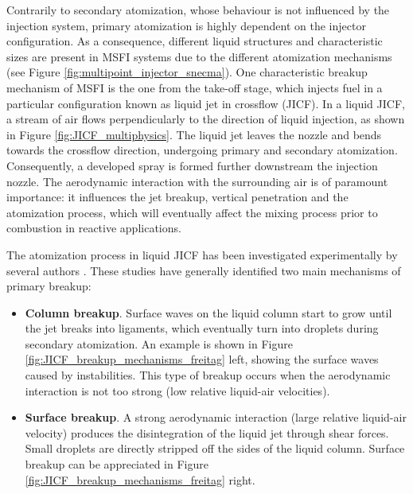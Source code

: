 Contrarily to secondary atomization, whose behaviour is not influenced by the injection system, primary atomization is highly dependent on the injector configuration. As a consequence, different liquid structures and characteristic sizes are present in MSFI systems due to the different atomization mechanisms (see Figure \ref{fig:multipoint_injector_snecma}). One characteristic breakup mechanism of MSFI is the one from the take-off stage, which injects fuel in a particular configuration known as liquid jet in crossflow (JICF). In a liquid JICF, a stream of air flows perpendicularly to the direction of liquid injection, as shown in Figure \ref{fig:JICF_multiphysics}. The liquid jet leaves the nozzle and bends towards the crossflow direction, undergoing primary and secondary atomization. Consequently, a developed spray is formed further downstream the injection nozzle. The aerodynamic interaction with the surrounding air is of paramount importance: it influences the jet breakup, vertical penetration and the atomization process, which will eventually affect the mixing process prior to combustion in reactive applications.

\clearpage


The atomization process in liquid JICF has been investigated experimentally by several authors . These studies have generally identified two main mechanisms of primary breakup:

\begin{itemize}

	\item \textbf{Column breakup}. Surface waves on the liquid column start to grow until the jet breaks into ligaments, which eventually turn into droplets during secondary atomization. An example is shown in Figure \ref{fig:JICF_breakup_mechanisms_freitag} left, showing the surface waves caused by instabilities. This type of breakup occurs when the aerodynamic interaction is not too strong (low relative liquid-air velocities).

\item \textbf{Surface breakup}. A strong aerodynamic interaction (large relative liquid-air velocity) produces the disintegration of the liquid jet through shear forces. Small droplets are directly
stripped off the sides of the liquid column. Surface breakup can be appreciated in Figure \ref{fig:JICF_breakup_mechanisms_freitag} right. 

\end{itemize}

